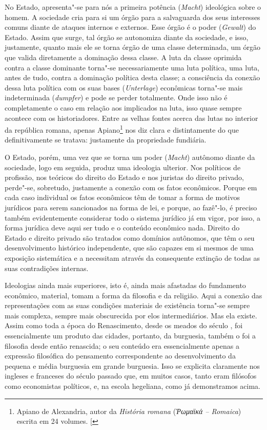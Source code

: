 No Estado, apresenta"-se para nós a primeira potência (\emph{Macht})
ideológica sobre o homem. A sociedade cria para si um órgão para a
salvaguarda dos seus interesses comuns diante de ataques internos e
externos. Esse órgão é o poder (\emph{Gewalt}) do Estado. Assim que
surge, tal órgão se autonomiza diante da sociedade, e isso, justamente,
quanto mais ele se torna órgão de uma classe determinada, um órgão que
valida diretamente a dominação dessa classe. A luta da classe oprimida
contra a classe dominante torna"-se necessariamente uma luta política,
uma luta, antes de tudo, contra a dominação política desta classe; a
consciência da conexão dessa luta política com os suas bases
(\emph{Unterlage}) econômicas torna"-se mais indeterminada
(\emph{dumpfer}) e pode se perder totalmente. Onde isso não é
completamente o caso em relação aos implicados na luta, isso quase
sempre acontece com os historiadores. Entre as velhas fontes acerca das
lutas no interior da república romana, apenas Apiano\footnote{Apiano de Alexandria, autor da \emph{História romana} (\emph{Ῥωμαϊκά -- Romaica}) escrita em 24 volumes. {[}\versal{N.\,T.}{]}} nos diz clara e distintamente do que definitivamente se tratava: justamente da
propriedade fundiária.

O Estado, porém, uma vez que se torna um poder (\emph{Macht}) autônomo
diante da sociedade, logo em seguida, produz uma ideologia ulterior. Nos
políticos de profissão, nos teóricos do direito do Estado e nos juristas
do direito privado, perde"-se, sobretudo, justamente a conexão com os
fatos econômicos. Porque em cada caso individual os fatos econômicos têm
de tomar a forma de motivos jurídicos para serem sancionados na forma de
lei, e porque, ao fazê"-lo, é preciso também evidentemente considerar
todo o sistema jurídico já em vigor, por isso, a forma jurídica deve
aqui ser tudo e o conteúdo econômico nada. Direito do Estado e direito
privado são tratados como domínios autônomos, que têm o seu
desenvolvimento histórico independente, que são capazes em si mesmos de
uma exposição sistemática e a necessitam através da consequente extinção
de todas as suas contradições internas.

Ideologias ainda mais superiores, isto é, ainda mais afastadas do
fundamento econômico, material, tomam a forma da filosofia e da
religião. Aqui a conexão das representações com as suas condições
materiais de existência torna"-se sempre mais complexa, sempre mais
obscurecida por elos intermediários. Mas ela existe. Assim como toda a
época do Renascimento, desde os meados do século , foi essencialmente
um produto das cidades, portanto, da burguesia, também o foi a filosofia
desde então renascida; o seu conteúdo era essencialmente apenas a
expressão filosófica do pensamento correspondente ao desenvolvimento da
pequena e média burguesia em grande burguesia. Isso se explicita
claramente nos ingleses e franceses do século passado que, em muitos
casos, tanto eram filósofos como economistas políticos, e, na escola
hegeliana, como já demonstramos acima.

